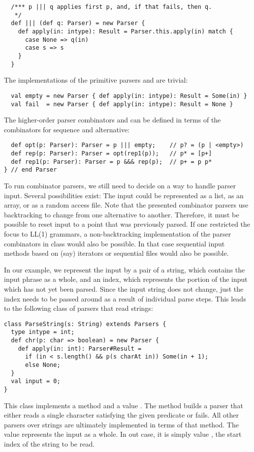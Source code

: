 {\begin{lstlisting}
  /*** p ||| q applies first p, and, if that fails, then q.
   */
  def ||| (def q: Parser) = new Parser {
    def apply(in: intype): Result = Parser.this.apply(in) match {
      case None => q(in)
      case s => s
    }
  }
\end{lstlisting}
The implementations of the primitive parsers  and 
are trivial:
\begin{lstlisting}
  val empty = new Parser { def apply(in: intype): Result = Some(in) }
  val fail  = new Parser { def apply(in: intype): Result = None }
\end{lstlisting}
The higher-order parser combinators  and  can be
defined in terms of the combinators for sequence and alternative:
\begin{lstlisting}
  def opt(p: Parser): Parser = p ||| empty;    // p? = (p | <empty>)
  def rep(p: Parser): Parser = opt(rep1(p));   // p* = [p+]
  def rep1(p: Parser): Parser = p &&& rep(p);  // p+ = p p*
} // end Parser
\end{lstlisting}
To run combinator parsers, we still need to decide on a way to handle
parser input. Several possibilities exist: The input could be
represented as a list, as an array, or as a random access file.  Note
that the presented combinator parsers use backtracking to change from
one alternative to another.  Therefore, it must be possible to reset
input to a point that was previously parsed. If one restricted the
focus to LL(1) grammars, a non-backtracking implementation of the
parser combinators in class  would also be possible. In
that case sequential input methods based on (say) iterators or
sequential files would also be possible.

In our example, we represent the input by a pair of a string, which
contains the input phrase as a whole, and an index, which represents
the portion of the input which has not yet been parsed. Since the
input string does not change, just the index needs to be passed around
as a result of individual parse steps.  This leads to the following
class of parsers that read strings:
\begin{lstlisting}
class ParseString(s: String) extends Parsers {
  type intype = int;
  def chr(p: char => boolean) = new Parser {
    def apply(in: int): Parser#Result = 
      if (in < s.length() && p(s charAt in)) Some(in + 1);
      else None;
  }
  val input = 0;
}
\end{lstlisting}
This class implements a method  and a
value . The  method builds a parser that either
reads a single character satisfying the given predicate  or
fails.  All other parsers over strings are ultimately implemented in
terms of that method. The  value represents the input as a
whole. In out case, it is simply value , the start index of
the string to be read.

}
